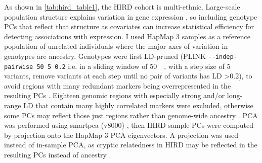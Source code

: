 As shown in \cref{tab:hird_table1}, the \gls{HIRD} cohort is multi-ethnic.
Large-scale population structure explains variation in gene expression \autocite{stegle2012UsingProbabilisticEstimation,brown2018ExpressionReflectsPopulation}, 
so including genotype \glspl{PC} that reflect that structure as covariates can increase statistical efficiency for detecting associations with expression.
I used HapMap 3 samples \autocite{theinternationalhapmap3consortium2010IntegratingCommonRare} as a reference population of unrelated individuals where the major axes of variation in genotypes are ancestry.
Genotypes were first \gls{LD}-pruned (PLINK \texttt{-{}-indep-pairwise 50 5 0.2} i.e. in a sliding window of \SI{50}{\kilo\bp}, with a step size of 5 variants, remove variants at each step until no pair of variants has \gls{LD} \num[round-precision=1]{>0.2}), 
to avoid regions with many redundant markers being overrepresented in the resulting \glspl{PC} \autocite{price2006PrincipalComponentsAnalysis,abdellaoui2013PopulationStructureMigration}.
Eighteen genomic regions with especially strong and/or long-range \gls{LD} that contain many highly correlated markers were excluded, otherwise some \glspl{PC} may reflect those just regions rather than genome-wide ancestry \autocite{price2006PrincipalComponentsAnalysis,prive2020EfficientToolkitImplementing}.
\Gls{PCA} was performed using smartpca (v8000) \autocite{price2006PrincipalComponentsAnalysis},
then \gls{HIRD} sample \glspl{PC} were computed by projection onto the HapMap 3 \gls{PCA} eigenvectors.
%
A projection was used instead of in-sample \gls{PCA}, as cryptic relatedness in \gls{HIRD} may be reflected in the resulting \glspl{PC} instead of ancestry \autocite{price2010NewApproachesPopulation}.
